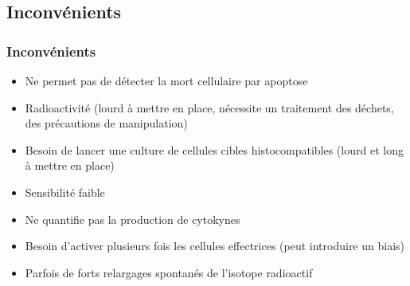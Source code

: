 \documentclass[12pt]{beamer}
\begin{document}

\subsection{Inconvénients}

\begin{frame}
  \transuncover
  \frametitle{Inconvénients}

  \begin{itemize}
  \item Ne permet pas de détecter la mort cellulaire par apoptose
  \item Radioactivité (lourd à mettre en place, nécessite un traitement des déchets, des précautions de manipulation)
  \item Besoin de lancer une culture de cellules cibles histocompatibles (lourd et long à mettre en place)
  \item Sensibilité faible
  \item Ne quantifie pas la production de cytokynes
  \item Besoin d'activer plusieurs fois les cellules effectrices (peut introduire un biais)
  \item Parfois de forts relargages spontanés de l'isotope radioactif
  \end{itemize}
\end{frame}
\end{document}

